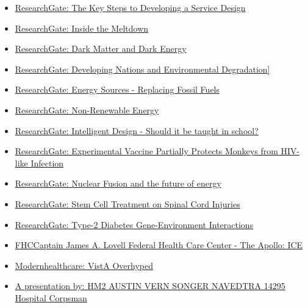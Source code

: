 \documentclass[a4papper,overlapped,line]{res}
\begin{document}
\begin{resume}
\begin{itemize}
	\item \href{https://www.researchgate.net/publication/291345962_The_Key_Steps_to_Developing_a_Service_Design}{ResearchGate: The Key Steps to Developing a Service Design}
	\item \href{https://www.researchgate.net/publication/289375564_Inside_the_Meltdown}{ResearchGate: Inside the Meltdown}
	\item \href{https://www.researchgate.net/publication/291346157_Dark_Matter_and_Dark_Energy}{ResearchGate: Dark Matter and Dark Energy}
	\item \href{https://www.researchgate.net/publication/291346162_Developing_nations_and_environmental_degradation}{ResearchGate: Developing Nations and Environmental Degradation]}
	\item \href{https://www.researchgate.net/publication/291346000_Energy_Sources_-_Replacing_Fossil_Fuels}{ResearchGate: Energy Sources - Replacing Fossil Fuels}
	\item \href{https://www.researchgate.net/publication/291346179_Non-Renewable_Energy}{ResearchGate: Non-Renewable Energy}
	\item \href{https://www.researchgate.net/publication/291346005_Intelligent_Design_-_Should_it_be_taught_in_school}{ResearchGate: Intelligent Design - Should it be taught in school?}
	\item \href{https://www.researchgate.net/publication/291346090_Experimental_Vaccine_Partially_Protects_Monkeys_from_HIV-Like_Infection}{ResearchGate: Experimental Vaccine Partially Protects Monkeys from HIV-like Infection}
	\item \href{https://www.researchgate.net/publication/291346182_Nuclear_Fusion_and_the_future_of_energy?ev=prf_pub}{ResearchGate: Nuclear Fusion and the future of energy}
	\item \href{https://www.researchgate.net/publication/291346103_Stem_Cell_Treatment_on_Spinal_Cord_Injuries}{ResearchGate: Stem Cell Treatment on Spinal Cord Injuries}
	\item \href{https://www.researchgate.net/publication/291346272_Type_2_Diabetes_Gene-Environment_Interactions}{ResearchGate: Type-2 Diabetes Gene-Environment Interactions}
	\item \href{http://www.lovell.fhcc.va.gov/MediaCenter/Newsletter/TheApolloJune2014.asp}{FHCCaptain James A. Lovell Federal Health Care Center - The Apollo: ICE}
	\item \href{http://www.modernhealthcare.com/article/20130415/NEWS/304159951}{Modernhealthcare: VistA Overhyped}
	\item \href{http://slideplayer.com/slide/2520115/}{A presentation by: HM2 AUSTIN VERN SONGER NAVEDTRA 14295 Hospital Corpsman}
	

\end{itemize}
\end{resume}
\end{document}
